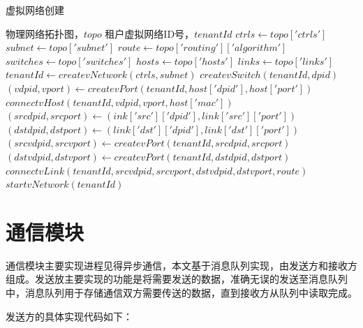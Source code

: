 \begin{algorithm}[!htb]
    \caption{虚拟网络创建}
    \begin{algorithmic}[1] %
        \Require 物理网络拓扑图，$topo$
        \Ensure 租户虚拟网络ID号，$tenantId$
            \State $ctrls \gets topo['ctrls']$
            \State $subnet \gets topo['subnet']$
            \State $route \gets topo['routing']['algorithm']$
            \State $switches \gets topo['switches']$
            \State $hosts \gets topo['hosts']$
            \State $links \gets topo['links']$
            \State $tenantId \gets createvNetwork(ctrls,subnet)$
            	\State $createvSwitch(tenantId, dpid)$
            \EndFor
            	\State $(vdpid, vport) \gets createvPort(tenantId, host['dpid'],host['port'])$
            	\State $connectvHost(tenantId, vdpid, vport, host['mac'])$
            \EndFor
            	\State$(srcdpid, srcport) \gets (ink['src']['dpid'], link['src']['port'])$
            	\State$(dstdpid, dstport) \gets (link['dst']['dpid'], link['dst']['port'])$
            	\State $(srcvdpid, srcvport) \gets createvPort(tenantId, srcdpid, srcport)$
            	\State $(dstvdpid, dstvport) \gets createvPort(tenantId, dstdpid, dstport)$
            	\State $connectvLink(tenantId, srcvdpid, srcvport, dstvdpid, dstvport, route)$
            \EndFor
            \State $startvNetwork(tenantId)$
            \State {}
        \EndFunction
    \end{algorithmic}
\end{algorithm}

\section{通信模块}
通信模块主要实现进程见得异步通信，本文基于消息队列实现，由发送方和接收方组成。发送放主要实现的功能是将需要发送的数据，准确无误的发送至消息队列中，消息队列用于存储通信双方需要传送的数据，直到接收方从队列中读取完成。

发送方的具体实现代码如下：

